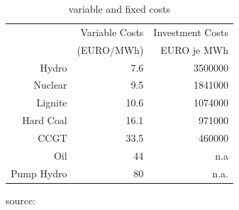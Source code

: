 \begin{table}
\begin{center}

\begin{tabular}{rrr}
\hline
           & Variable Costs & Investment Costs \\

           & (EURO/MWh) & EURO je MWh \\
\hline
     Hydro &        7.6 &    3500000 \\

   Nuclear &        9.5 &    1841000 \\

   Lignite &       10.6 &    1074000 \\

 Hard Coal &       16.1 &     971000 \\

CCGT &       33.5 &     460000 \\

Oil & 44            &   n.a \\

Pump Hydro &         80 &       n.a. \\
\hline
\end{tabular}  

\end{center}
\label{tab:costs}
\caption{variable and fixed costs}
\begin{center}
source: \cite{Auer2006}
\end{center}
\end{table}


\clearpage

